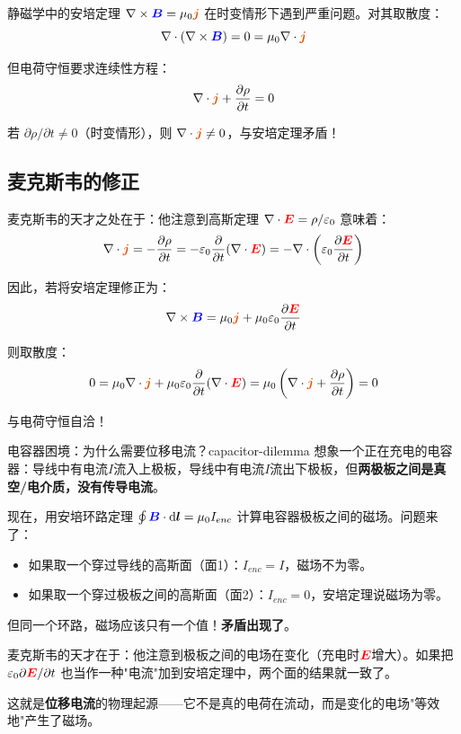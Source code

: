 \documentclass[11pt,a4paper,openany,oneside]{book}
\newcommand{\diff}{\mathrm{d}}
\newcommand{\vecE}{\textcolor{red}{\vect{E}}}
\newcommand{\vecB}{\textcolor{blue}{\vect{B}}}
\newcommand{\vecJ}{\textcolor{cororange}{\vect{j}}}
\newcommand{\eps}{\varepsilon}
\newcommand{\muz}{\mu_0}
\newcommand{\vect}[1]{\bm{#1}}
\newcommand{\curl}{\nabla\times}
\newcommand{\divg}{\nabla\cdot}
\begin{document}
静磁学中的安培定理 $\curl\vecB = \muz\vecJ$ 在时变情形下遇到严重问题。对其取散度：
\[
\divg(\curl\vecB) = 0 = \muz\divg\vecJ
\]

但电荷守恒要求连续性方程：
\[
\divg\vecJ + \frac{\partial\rho}{\partial t} = 0
\]

若 $\partial\rho/\partial t \neq 0$（时变情形），则 $\divg\vecJ \neq 0$，与安培定理矛盾！

\subsection{麦克斯韦的修正}

麦克斯韦的天才之处在于：他注意到高斯定理 $\divg\vecE = \rho/\eps_0$ 意味着：
\[
\divg\vecJ = -\frac{\partial\rho}{\partial t} = -\eps_0\frac{\partial}{\partial t}(\divg\vecE) = -\divg\left(\eps_0\frac{\partial\vecE}{\partial t}\right)
\]

因此，若将安培定理修正为：
\[
\curl\vecB = \muz\vecJ + \muz\eps_0\frac{\partial\vecE}{\partial t}
\]

则取散度：
\[
0 = \muz\divg\vecJ + \muz\eps_0\frac{\partial}{\partial t}(\divg\vecE) = \muz\left(\divg\vecJ + \frac{\partial\rho}{\partial t}\right) = 0
\]

与电荷守恒自洽！


\begin{insight}{电容器困境：为什么需要位移电流？}{capacitor-dilemma}
想象一个正在充电的电容器：导线中有电流$I$流入上极板，导线中有电流$I$流出下极板，但\textbf{两极板之间是真空/电介质，没有传导电流}。

现在，用安培环路定理 $\oint\vecB\cdot\diff\vect{l}=\mu_0 I_{enc}$ 计算电容器极板之间的磁场。问题来了：
\begin{itemize}
\item 如果取一个穿过导线的高斯面（面1）：$I_{enc}=I$，磁场不为零。
\item 如果取一个穿过极板之间的高斯面（面2）：$I_{enc}=0$，安培定理说磁场为零。
\end{itemize}

但同一个环路，磁场应该只有一个值！\textbf{矛盾出现了}。

麦克斯韦的天才在于：他注意到极板之间的电场在变化（充电时$\vecE$增大）。如果把 $\eps_0\partial\vecE/\partial t$ 也当作一种"电流"加到安培定理中，两个面的结果就一致了。

这就是\textbf{位移电流}的物理起源——它不是真的电荷在流动，而是变化的电场"等效地"产生了磁场。
\end{insight}
\end{document}
